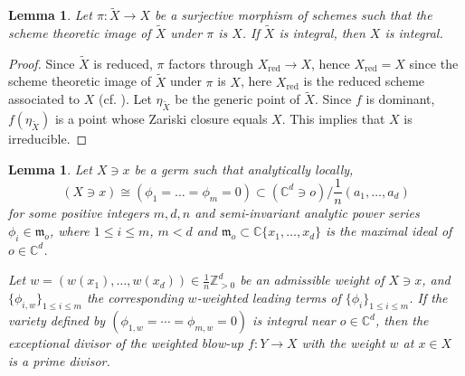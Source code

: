 \documentclass[11pt]{amsart}
\numberwithin{equation}{section}
\newcommand{\Cc}{\mathbb{C}}
\newcommand{\Zz}{\mathbb{Z}}
\newcommand{\fm}{\mathfrak{m}}
\newtheorem{lem}[thm]{Lemma}
\theoremstyle{definition}
\theoremstyle{definition}
\begin{document}
\begin{lem}\label{lem: irr by dominant morphism}
Let $\pi: \tilde{X}\to X$ be a surjective morphism of schemes such that the scheme theoretic image of $\tilde{X}$ under $\pi$ is $X$. If $\tilde{X}$ is integral, then $X$ is integral.
\end{lem}

\begin{proof}
Since $\tilde{X}$ is reduced, $\pi$ factors through $X_{\mathrm{red}}\to X$, hence $X_{\mathrm{red}}=X$ since the scheme theoretic image of $\tilde{X}$ under $\pi$ is $X$, here $X_{\mathrm{red}}$ is the reduced scheme associated to $X$ (cf. \cite[\S2,~Exercise~2.3]{Har77}). Let $\eta_{\tilde{X}}$ be the generic point of $\tilde{X}$. Since $f$ is dominant, $f(\eta_{\tilde{X}})$ is a point whose Zariski closure equals $X$. This implies that $X$ is irreducible.
\end{proof}

\begin{lem}\label{lem: weight leading term irr imply irr exceptional divisor}
Let $X\ni x$ be a germ such that analytically locally,
$$(X\ni x)\cong (\phi_1=\dots =\phi_m=0)\subset (\mathbb C^d\ni o)/\frac{1}{n}(a_1,\dots,a_d)$$ for some positive integers $m,d,n$ and semi-invariant analytic power series $\phi_i\in \fm_o$, where $1\leq i\leq m$, $m<d$ and $\fm_o\subset \Cc\{x_1,\dots,x_d\}$ is the maximal ideal of $o\in \Cc^d$.

Let $w=(w(x_1),\dots,w(x_d))\in \frac{1}{n}\Zz^d_{>0}$ be an admissible weight of $X\ni x$, and $\{\phi_{i,w}\}_{1\leq i\leq m}$ the corresponding $w$-weighted leading terms of $\{\phi_{i}\}_{1\leq i\leq m}$. If the variety defined by $(\phi_{1,w}=\cdots =\phi_{m,w}=0)$ is integral near $o\in \Cc^d$, then the exceptional divisor of the weighted blow-up $f: Y\to X$ with the weight $w$ at $x\in X$ is a prime divisor.
\end{lem}
\end{document}
